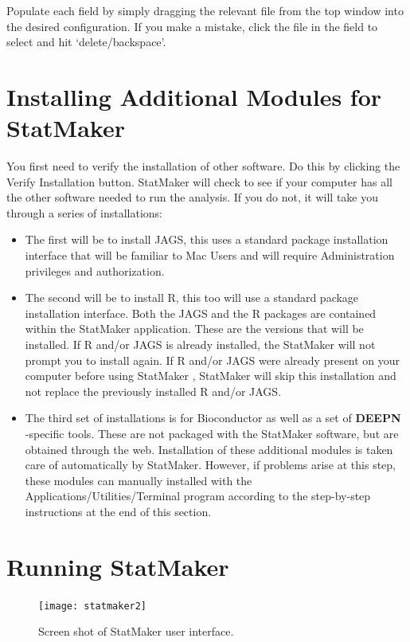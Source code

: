 \documentclass[11pt,fleqn]{book} %
\newcommand{\DEEPN}{\textbf{DEEPN }}
\newcommand{\StatMaker}{{\color{Dandelion} StatMaker }}
\begin{document}
Populate each field by simply dragging the relevant file from the top window into the desired configuration.  If you make a mistake, click the file in the field to select and hit ‘delete/backspace’.


\section{Installing Additional Modules for StatMaker}

You first need to verify the installation of other software.  Do this by clicking the 
Verify Installation button. \StatMaker will check to see if your computer has all the other software needed to run the analysis.  If you do not, it will take you through a series of installations:
\begin{itemize}
    \item The first will be to install JAGS, this uses a standard package installation interface that will be familiar to Mac Users and will require Administration privileges and authorization.
    \item The second will be to install R, this too will use a standard package installation interface. Both the JAGS and the R packages are contained within the StatMaker application.  These are the versions that will be installed. If R and/or JAGS is already installed, the StatMaker will not prompt you to install again.  If R and/or JAGS were already present on your computer before using \StatMaker, \StatMaker will skip this installation and not replace the previously installed R and/or JAGS.
    \item The third set of installations is for Bioconductor as well as a set of \DEEPN-specific tools.  These are not packaged with the \StatMaker software, but are obtained through the web.  Installation of these additional modules is taken care of automatically by StatMaker.  However, if problems arise at this step, these modules can manually installed with the Applications/Utilities/Terminal program according to the step-by-step instructions at the end of this section.
\end{itemize}

\section{Running StatMaker}

\begin{figure}[!ht]
    \centering
    \texttt{[image: statmaker2]}
    \caption{Screen shot of \StatMaker user interface.}
    \label{fig:StatMaker_Output_File}
\end{figure}
\end{document}
